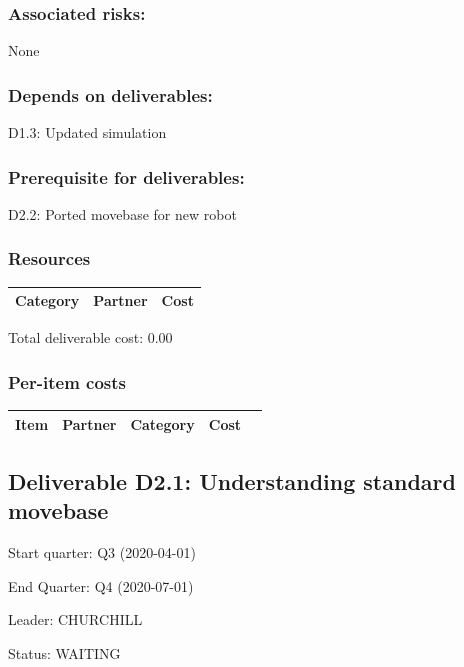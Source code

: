 \documentclass[english]{article}
\begin{document}
\subsubsection*{Associated risks:}

None

\subsubsection*{Depends on deliverables:}

D1.3: Updated simulation



\subsubsection*{Prerequisite for deliverables:}

D2.2: Ported movebase for new robot



\subsubsection*{Resources}

\begin{tabular}{ | l | l | r | }
\hline
 Category & Partner & Cost \\ 
 \hline
 \hline
 \end{tabular}

Total deliverable cost:  0.00

\subsubsection*{Per-item costs}

\begin{tabular}{ | l | c | c | r | c | }
\hline
 Item & Partner & Category & Cost \\ 
 \hline
 \hline
 \end{tabular}

\newpage\subsection*{Deliverable D2.1: Understanding standard movebase }

Start quarter: Q3 (2020-04-01) 
 
 End Quarter: Q4 (2020-07-01) 

 Leader: CHURCHILL

  Status: WAITING 
\end{document}
